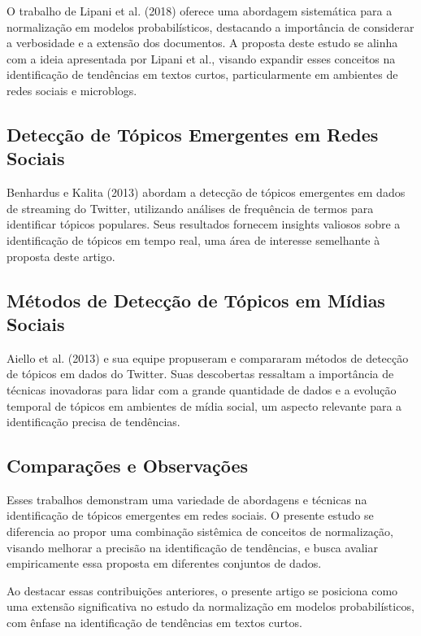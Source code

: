 \documentclass[runningheads]{llncs}
\begin{document}
O trabalho de Lipani et al. (2018) \cite{Lipani2018} oferece uma abordagem sistemática para a normalização em modelos probabilísticos, destacando a importância de considerar a verbosidade e a extensão dos documentos. A proposta deste estudo se alinha com a ideia apresentada por Lipani et al., visando expandir esses conceitos na identificação de tendências em textos curtos, particularmente em ambientes de redes sociais e microblogs.

\subsection{Detecção de Tópicos Emergentes em Redes Sociais}

Benhardus e Kalita (2013) \cite{Benhardus2013} abordam a detecção de tópicos emergentes em dados de streaming do Twitter, utilizando análises de frequência de termos para identificar tópicos populares. Seus resultados fornecem insights valiosos sobre a identificação de tópicos em tempo real, uma área de interesse semelhante à proposta deste artigo.

\subsection{Métodos de Detecção de Tópicos em Mídias Sociais}

Aiello et al. (2013) \cite{Aiello2013} e sua equipe propuseram e compararam métodos de detecção de tópicos em dados do Twitter. Suas descobertas ressaltam a importância de técnicas inovadoras para lidar com a grande quantidade de dados e a evolução temporal de tópicos em ambientes de mídia social, um aspecto relevante para a identificação precisa de tendências.

\subsection{Comparações e Observações}

Esses trabalhos demonstram uma variedade de abordagens e técnicas na identificação de tópicos emergentes em redes sociais. O presente estudo se diferencia ao propor uma combinação sistêmica de conceitos de normalização, visando melhorar a precisão na identificação de tendências, e busca avaliar empiricamente essa proposta em diferentes conjuntos de dados.

Ao destacar essas contribuições anteriores, o presente artigo se posiciona como uma extensão significativa no estudo da normalização em modelos probabilísticos, com ênfase na identificação de tendências em textos curtos.
\end{document}
